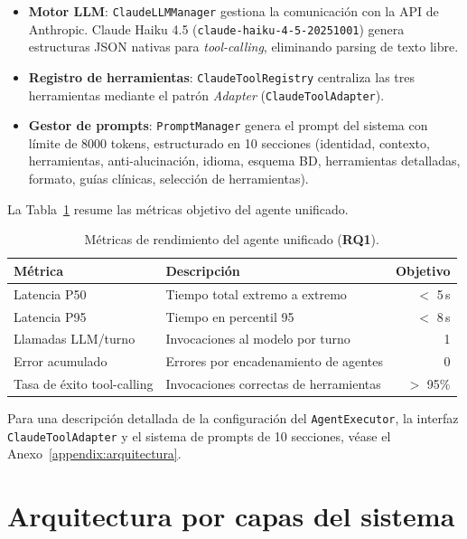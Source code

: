 \begin{itemize}[nosep, leftmargin=*]
  \item \textbf{Motor LLM}: \texttt{ClaudeLLMManager} gestiona la comunicación con la \ac{API} de Anthropic. Claude Haiku 4.5 (\texttt{claude-haiku-4-5-20251001}) genera estructuras \ac{JSON} nativas para \textit{tool-calling}, eliminando parsing de texto libre.
  \item \textbf{Registro de herramientas}: \texttt{ClaudeToolRegistry} centraliza las tres herramientas mediante el patrón \textit{Adapter} (\texttt{ClaudeToolAdapter}).
  \item \textbf{Gestor de prompts}: \texttt{PromptManager} genera el prompt del sistema con límite de 8000 tokens, estructurado en 10 secciones (identidad, contexto, herramientas, anti-alucinación, idioma, esquema BD, herramientas detalladas, formato, guías clínicas, selección de herramientas).
\end{itemize}

La Tabla~\ref{tab:metricas_agente} resume las métricas objetivo del agente unificado.

\begin{table}[H]
\centering
\caption{Métricas de rendimiento del agente unificado (\textbf{RQ1}).}
\label{tab:metricas_agente}
\footnotesize
\begin{tabularx}{\columnwidth}{lXr}
\toprule
\textbf{Métrica} & \textbf{Descripción} & \textbf{Objetivo} \\
\midrule
Latencia P50 & Tiempo total extremo a extremo & $<$ 5\,s \\
Latencia P95 & Tiempo en percentil 95 & $<$ 8\,s \\
Llamadas \ac{LLM}/turno & Invocaciones al modelo por turno & 1 \\
Error acumulado & Errores por encadenamiento de agentes & 0 \\
Tasa de éxito tool-calling & Invocaciones correctas de herramientas & $>$ 95\% \\
\bottomrule
\end{tabularx}
\end{table}

Para una descripción detallada de la configuración del \texttt{AgentExecutor}, la interfaz \texttt{ClaudeToolAdapter} y el sistema de prompts de 10 secciones, véase el Anexo~\ref{appendix:arquitectura}.

\section{Arquitectura por capas del sistema}
\label{sec:arquitectura_capas}

